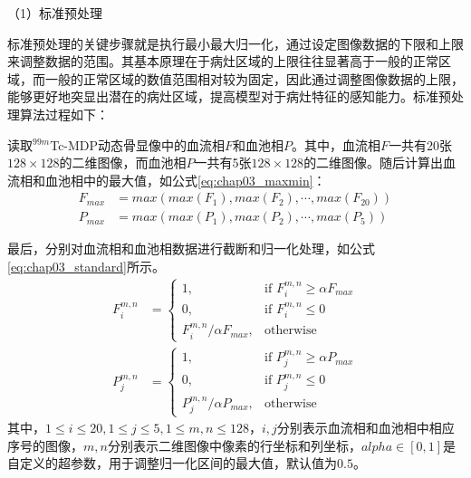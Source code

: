 （1）标准预处理

标准预处理的关键步骤就是执行最小最大归一化，通过设定图像数据的下限和上限来调整数据的范围。其基本原理在于病灶区域的上限往往显著高于一般的正常区域，而一般的正常区域的数值范围相对较为固定，因此通过调整图像数据的上限，能够更好地突显出潜在的病灶区域，提高模型对于病灶特征的感知能力。标准预处理算法过程如下：

读取\(^{99m}\)Tc-MDP动态骨显像中的血流相\(F\)和血池相\(P\)。其中，血流相\(F\)一共有20张\(128 \times 128\)的二维图像，而血池相\(P\)一共有5张\(128 \times 128\)的二维图像。随后计算出血流相和血池相中的最大值，如公式\ref{eq:chap03_maxmin}：
\begin{equation}
  \begin{aligned}
    F_{max} & = max(max(F_1), max(F_2), \cdots, max(F_{20})) \\
    P_{max} & = max(max(P_1), max(P_2), \cdots, max(P_5))
  \end{aligned}
  \label{eq:chap03_maxmin}
\end{equation}

最后，分别对血流相和血池相数据进行截断和归一化处理，如公式\ref{eq:chap03_standard}所示。
\begin{equation}
  \begin{aligned}
    F_i^{m, n} & =
    \begin{cases}
      1,                           & \text{if \(F_i^{m, n} \geq \alpha F_{max} \)} \\
      0,                           & \text{if \(F_i^{m, n} \leq 0\)}               \\
      F_i^{m, n} / \alpha F_{max}, & \text{otherwise}
    \end{cases} \\
    P_j^{m, n} & =
    \begin{cases}
      1,                           & \text{if \(P_j^{m, n} \geq \alpha P_{max} \)} \\
      0,                           & \text{if \(P_j^{m, n} \leq 0\)}               \\
      P_j^{m, n} / \alpha P_{max}, & \text{otherwise}
    \end{cases}
  \end{aligned}
  \label{eq:chap03_standard}
\end{equation}
其中，\( 1 \leq i \leq 20, 1 \leq j \leq 5, 1 \leq m, n \leq 128 \)，\(i, j\)分别表示血流相和血池相中相应序号的图像，\(m, n\)分别表示二维图像中像素的行坐标和列坐标，\(alpha \in [0,1]\)是自定义的超参数，用于调整归一化区间的最大值，默认值为\(0.5\)。

